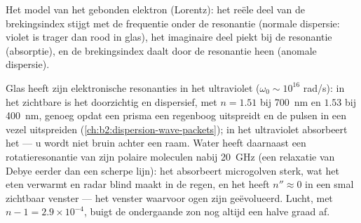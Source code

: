 \begin{omfigure}

{\small Het model van het gebonden elektron (Lorentz): het reële deel van de
brekingsindex stijgt met de frequentie onder de resonantie (normale
dispersie: violet is trager dan rood in glas), het imaginaire deel piekt bij
de resonantie (absorptie), en de brekingsindex daalt door de resonantie heen
(anomale dispersie).}
\end{omfigure}

\begin{example}\label{ex:b2:waves-in-media:dielectrics}
Glas heeft zijn elektronische resonanties in het ultraviolet
($\omega_0 \sim 10^{16}$ rad/s): in het zichtbare is het doorzichtig en
dispersief, met $n = 1.51$ bij \qty{700}{nm} en $1.53$ bij \qty{400}{nm},
genoeg opdat een prisma een regenboog uitspreidt en de pulsen in een vezel
uitspreiden (\cref{ch:b2:dispersion-wave-packets}); in het ultraviolet
absorbeert het --- u wordt niet bruin achter een raam. Water heeft daarnaast
een rotatieresonantie van zijn polaire moleculen nabij \qty{20}{GHz} (een
relaxatie van Debye eerder dan een scherpe lijn): het absorbeert microgolven
sterk, wat het eten verwarmt en radar blind maakt in de regen, en het heeft
$n'' \approx 0$ in een smal zichtbaar venster --- het venster waarvoor ogen
zijn geëvolueerd. Lucht, met $n - 1 = 2.9 \times 10^{-4}$, buigt de
ondergaande zon nog altijd een halve graad af.
\end{example}

